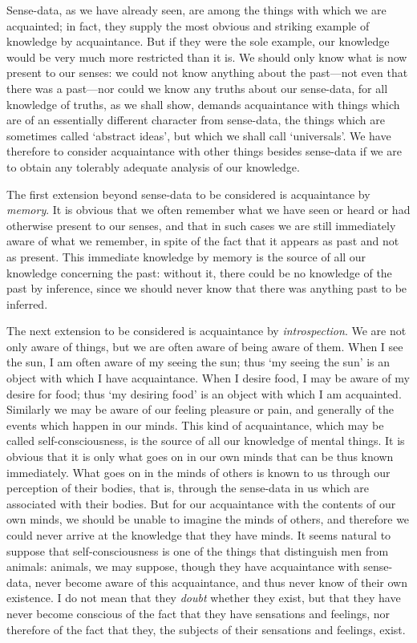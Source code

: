 \documentclass[oneside,letterpaper,12pt]{book}
\begin{document}
Sense-data, as we have already seen, are among the things with which we
are acquainted; in fact, they supply the most obvious and striking
example of knowledge by acquaintance. But if they were the sole example,
our knowledge would be very much more restricted than it is. We should
only know what is now present to our senses: we could not know anything
about the past---not even that there was a past---nor could we know any
truths about our sense-data, for all knowledge of truths, as we shall
show, demands acquaintance with things which are of an essentially
different character from sense-data, the things which are sometimes
called `abstract ideas', but which we
shall call `universals'. We have
therefore to consider acquaintance with other things besides sense-data
if we are to obtain any tolerably adequate analysis of our knowledge.

The first extension beyond sense-data to be considered is acquaintance
by \emph{memory}. It is obvious that we often remember what we have seen
or heard or had otherwise present to our senses, and that in such cases
we are still immediately aware of what we remember, in spite of the fact
that it appears as past and not as present. This immediate knowledge by
memory is the source of all our knowledge concerning the past: without
it, there could be no knowledge of the past by inference, since we
should never know that there was anything past to be inferred.

The next extension to be considered is acquaintance by
\emph{introspection}. We are not only aware of things, but we are often
aware of being aware of them. When I see the sun, I am often aware of my
seeing the sun; thus `my seeing the
sun' is an object with which I have acquaintance. When
I desire food, I may be aware of my desire for food; thus
`my desiring food' is an object with
which I am acquainted. Similarly we may be aware of our feeling pleasure
or pain, and generally of the events which happen in our minds. This
kind of acquaintance, which may be called self-consciousness, is the
source of all our knowledge of mental things. It is obvious that it is
only what goes on in our own minds that can be thus known immediately.
What goes on in the minds of others is known to us through our
perception of their bodies, that is, through the sense-data in us which
are associated with their bodies. But for our acquaintance with the
contents of our own minds, we should be unable to imagine the minds of
others, and therefore we could never arrive at the knowledge that they
have minds. It seems natural to suppose that self-consciousness is one
of the things that distinguish men from animals: animals, we may
suppose, though they have acquaintance with sense-data, never become
aware of this acquaintance, and thus never know of their own existence. 
I do not mean that they \emph{doubt} whether
they exist, but that they have never become conscious of the fact that
they have sensations and feelings, nor therefore of the fact that they,
the subjects of their sensations and feelings, exist.
\end{document}
